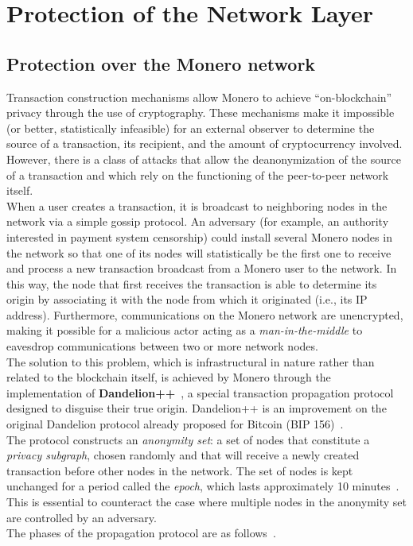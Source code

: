 \documentclass[conference]{IEEEtran}
\begin{document}

\section{Protection of the Network Layer}
\subsection{Protection over the Monero network}
Transaction construction mechanisms allow Monero to achieve ``on-blockchain'' privacy through the use of cryptography. These mechanisms make it impossible (or better, statistically infeasible) for an external observer to determine the source of a transaction, its recipient, and the amount of cryptocurrency involved. However, there is a class of attacks that allow the deanonymization of the source of a transaction and which rely on the functioning of the peer-to-peer network itself.~\cite{mastering_monero}\\
When a user creates a transaction, it is broadcast to neighboring nodes in the network via a simple gossip protocol. An adversary (for example, an authority interested in payment system censorship) could install several Monero nodes in the network so that one of its nodes will statistically be the first one to receive and process a new transaction broadcast from a Monero user to the network. In this way, the node that first receives the transaction is able to determine its origin by associating it with the node from which it originated (i.e., its IP address). Furthermore, communications on the Monero network are unencrypted, making it possible for a malicious actor acting as a \textit{man-in-the-middle} to eavesdrop communications between two or more network nodes.~\cite{dandelion_plus_plus}\\

The solution to this problem, which is infrastructural in nature rather than related to the blockchain itself, is achieved by Monero through the implementation of \textbf{Dandelion++}~\cite{dandelion_plus_plus}, a special transaction propagation protocol designed to disguise their true origin. Dandelion++ is an improvement on the original Dandelion protocol already proposed for Bitcoin (BIP 156)~\cite{bip_156}.\\
The protocol constructs an \textit{anonymity set}: a set of nodes that constitute a \textit{privacy subgraph}, chosen randomly and that will receive a newly created transaction before other nodes in the network. The set of nodes is kept unchanged for a period called the \textit{epoch}, which lasts approximately 10 minutes~\cite{dandelion_plus_plus}. This is essential to counteract the case where multiple nodes in the anonymity set are controlled by an adversary.\\
The phases of the propagation protocol are as follows~\cite{dandelion_plus_plus}.
\end{document}
